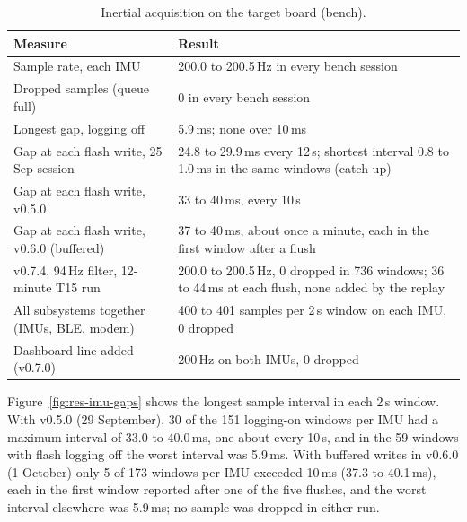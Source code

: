 \begin{table}[htbp]
\centering
\caption[Inertial acquisition on the target board (bench)]{Inertial acquisition on the target board (bench).}
\label{tab:res-acquisition}
\begin{tabular}{|p{6.2cm}|p{7.6cm}|}
\hline
\textbf{Measure} & \textbf{Result} \\ \hline
Sample rate, each IMU & 200.0 to 200.5\,Hz in every bench session \\ \hline
Dropped samples (queue full) & 0 in every bench session \\ \hline
Longest gap, logging off & 5.9\,ms; none over 10\,ms \\ \hline
Gap at each flash write, 25 Sep session & 24.8 to 29.9\,ms every 12\,s; shortest interval 0.8 to 1.0\,ms in the same windows (catch-up) \\ \hline
Gap at each flash write, v0.5.0 & 33 to 40\,ms, every 10\,s \\ \hline
Gap at each flash write, v0.6.0 (buffered) & 37 to 40\,ms, about once a minute, each in the first window after a flush \\ \hline
v0.7.4, 94\,Hz filter, 12-minute T15 run & 200.0 to 200.5\,Hz, 0 dropped in 736 windows; 36 to 44\,ms at each flush, none added by the replay \\ \hline
All subsystems together (IMUs, BLE, modem) & 400 to 401 samples per 2\,s window on each IMU, 0 dropped \\ \hline
Dashboard line added (v0.7.0) & 200\,Hz on both IMUs, 0 dropped \\ \hline
\end{tabular}
\end{table}

Figure~\ref{fig:res-imu-gaps} shows the longest sample interval in each 2\,s window. With v0.5.0 (29 September), 30 of the 151 logging-on windows per IMU had a maximum interval of 33.0 to 40.0\,ms, one about every 10\,s, and in the 59 windows with flash logging off the worst interval was 5.9\,ms. With buffered writes in v0.6.0 (1 October) only 5 of 173 windows per IMU exceeded 10\,ms (37.3 to 40.1\,ms), each in the first window reported after one of the five flushes, and the worst interval elsewhere was 5.9\,ms; no sample was dropped in either run.

